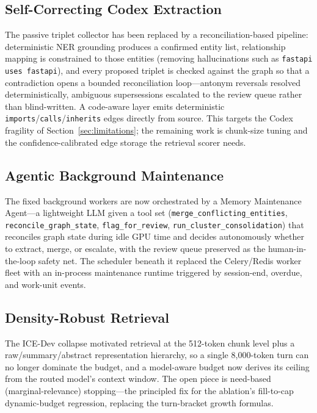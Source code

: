 \documentclass[10pt]{article}
\begin{document}
\subsection{Self-Correcting Codex Extraction}
The passive triplet collector has been replaced by a reconciliation-based pipeline: deterministic NER grounding produces a confirmed entity list, relationship mapping is constrained to those entities (removing hallucinations such as \texttt{fastapi uses fastapi}), and every proposed triplet is checked against the graph so that a contradiction opens a bounded reconciliation loop---antonym reversals resolved deterministically, ambiguous supersessions escalated to the review queue rather than blind-written. A code-aware layer emits deterministic \texttt{imports}/\texttt{calls}/\texttt{inherits} edges directly from source. This targets the Codex fragility of Section~\ref{sec:limitations}; the remaining work is chunk-size tuning and the confidence-calibrated edge storage the retrieval scorer needs.

\subsection{Agentic Background Maintenance}
The fixed background workers are now orchestrated by a Memory Maintenance Agent---a lightweight LLM given a tool set (\texttt{merge\_conflicting\_entities}, \texttt{reconcile\_graph\_state}, \texttt{flag\_for\_review}, \texttt{run\_cluster\_consolidation}) that reconciles graph state during idle GPU time and decides autonomously whether to extract, merge, or escalate, with the review queue preserved as the human-in-the-loop safety net. The scheduler beneath it replaced the Celery/Redis worker fleet with an in-process maintenance runtime triggered by session-end, overdue, and work-unit events.

\subsection{Density-Robust Retrieval}
The ICE-Dev collapse motivated retrieval at the 512-token chunk level plus a raw/summary/abstract representation hierarchy, so a single 8{,}000-token turn can no longer dominate the budget, and a model-aware budget now derives its ceiling from the routed model's context window. The open piece is need-based (marginal-relevance) stopping---the principled fix for the ablation's fill-to-cap dynamic-budget regression, replacing the turn-bracket growth formulas.
\end{document}
